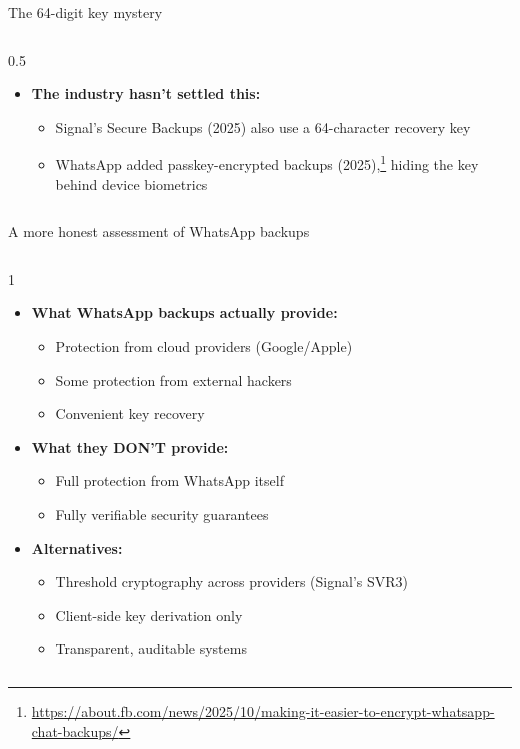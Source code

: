 \ifdefined\PRESENTATION\else\PassOptionsToClass{handout}{beamer}\fi\documentclass[aspectratio=169, lualatex]{beamer}
\begin{document}
\begin{frame}{The 64-digit key mystery}
\begin{columns}[c]
\begin{column}{0.5\textwidth}
\begin{itemize}
				\item \textbf{The industry hasn't settled this:}
				      \begin{itemize}
					      \item Signal's Secure Backups (2025) also use a 64-character recovery key
					      \item WhatsApp added passkey-encrypted backups (2025),\footnote{\url{https://about.fb.com/news/2025/10/making-it-easier-to-encrypt-whatsapp-chat-backups/}} hiding the key behind device biometrics
				      \end{itemize}
			\end{itemize}
		\end{column}
	\end{columns}
\end{frame}

\begin{frame}{A more honest assessment of WhatsApp backups}
	\begin{columns}[c]
		\begin{column}{1\textwidth}
			\begin{itemize}
				\item \textbf{What WhatsApp backups actually provide:}
				      \begin{itemize}
					      \item Protection from cloud providers (Google/Apple)
					      \item Some protection from external hackers
					      \item Convenient key recovery
				      \end{itemize}
				\item \textbf{What they DON'T provide:}
				      \begin{itemize}
					      \item Full protection from WhatsApp itself
					      \item Fully verifiable security guarantees
				      \end{itemize}
				\item \textbf{Alternatives:}
				      \begin{itemize}
					      \item Threshold cryptography across providers (Signal's SVR3)
					      \item Client-side key derivation only
					      \item Transparent, auditable systems
				      \end{itemize}
			\end{itemize}
		\end{column}
	\end{columns}
\end{frame}
\end{document}
